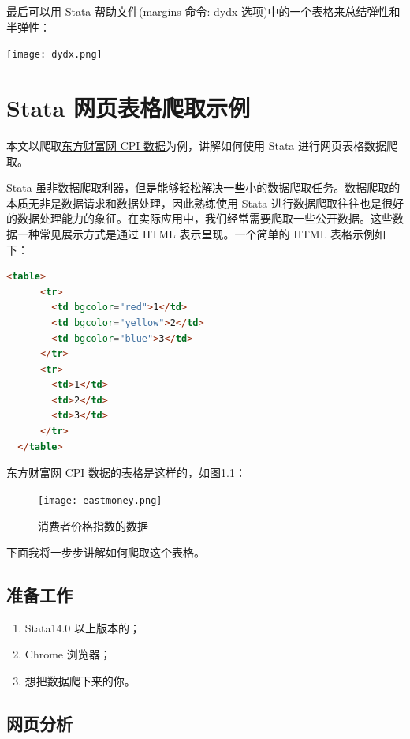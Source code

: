 \documentclass[cn,fancy,blue,11pt]{elegantbook}
\begin{document}
最后可以用 Stata 帮助文件(margins 命令: dydx 选项)中的一个表格来总结弹性和半弹性：

\noindent\texttt{[image: dydx.png]}

\hypertarget{stata--8}{%
\chapter{Stata 网页表格爬取示例}\label{stata--8}}

本文以爬取\href{http://data.eastmoney.com/cjsj/cpi.html}{东方财富网 CPI 数据}为例，讲解如何使用 Stata 进行网页表格数据爬取。

Stata 虽非数据爬取利器，但是能够轻松解决一些小的数据爬取任务。数据爬取的本质无非是数据请求和数据处理，因此熟练使用 Stata 进行数据爬取往往也是很好的数据处理能力的象征。在实际应用中，我们经常需要爬取一些公开数据。这些数据一种常见展示方式是通过 HTML 表示呈现。一个简单的 HTML 表格示例如下：

\begin{lstlisting}[language = HTML]
  <table>
      <tr>
        <td bgcolor="red">1</td>
        <td bgcolor="yellow">2</td>
        <td bgcolor="blue">3</td>
      </tr>
      <tr>
        <td>1</td>
        <td>2</td>
        <td>3</td>
      </tr>
  </table>
\end{lstlisting}

\href{http://data.eastmoney.com/cjsj/cpi.html}{东方财富网 CPI 数据}的表格是这样的，如图\ref{fig:eastmoney}：

\begin{figure}
  \centering
  \texttt{[image: eastmoney.png]}
  \caption{消费者价格指数的数据}
  \label{fig:eastmoney}
\end{figure}

下面我将一步步讲解如何爬取这个表格。

\hypertarget{section-29}{%
\section{准备工作}\label{section-29}}

\begin{enumerate}
\item
  Stata14.0 以上版本的；
\item
  Chrome 浏览器；
\item
  想把数据爬下来的你。
\end{enumerate}

\hypertarget{section-30}{%
\section{网页分析}\label{section-30}}
\end{document}
